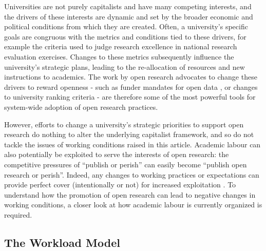 \documentclass[ authordate, meta, issue]{jote-new-article}
\begin{document}
Universities are not purely capitalists and have many competing interests, and the drivers of these interests are dynamic and set by the broader economic and political conditions from which they are created. Often, a university’s specific goals are congruous with the metrics and conditions tied to these drivers, for example the criteria used to judge research excellence in national research evaluation exercises. Changes to these metrics subsequently influence the university’s strategic plans, leading to the re-allocation of resources and new instructions to academics. The work by open research advocates to change these drivers to reward openness - such as funder mandates for open data \parencites{Hefce2016}, or changes to university ranking criteria \parencites{Pagliaro2021} - are therefore some of the most powerful tools for system-wide adoption of open research practices.



However, efforts to change a university’s strategic priorities to support open research do nothing to alter the underlying capitalist framework, and so do not tackle the issues of working conditions raised in this article. Academic labour can also potentially be exploited to serve the interests of open research: the competitive pressures of “publish or perish” can easily become “publish open research or perish”. Indeed, any changes to working practices or expectations can provide perfect cover (intentionally or not) for increased exploitation \parencites{Hostler2022}. To understand how the promotion of open research can lead to negative changes in working conditions, a closer look at how academic labour is currently organized is required.



\subsection{The Workload Model}
\end{document}
